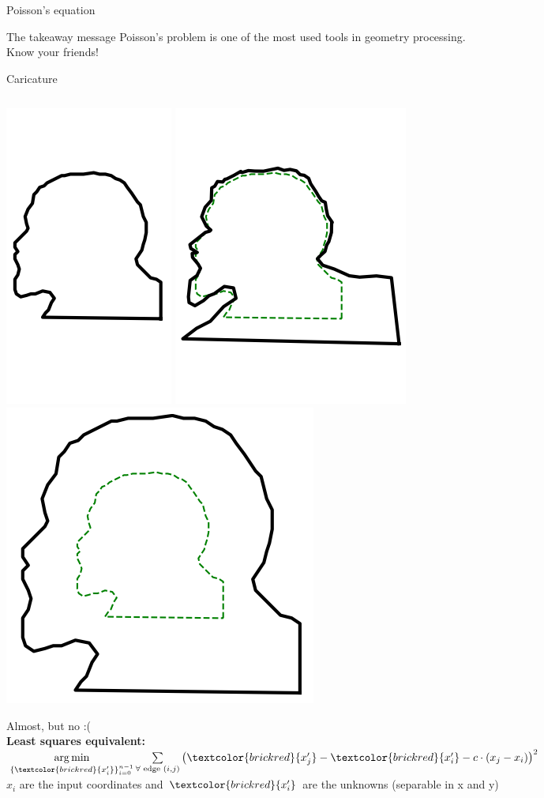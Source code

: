 \documentclass[UKenglish,aspectratio=169]{beamer}
\DeclareMathOperator*{\argmin}{arg\,min}
\newcommand\unknown[1]{\textcolor{brickred}{#1}}
\begin{document}
\begin{frame}{Poisson's equation}
\vspace{10ex}
\begin{block}{The takeaway message}
Poisson's problem is one of the most used tools in geometry processing.\\
Know your friends!
\end{block}
\end{frame}




\begin{frame}{Caricature}
\inputminted[fontsize=\footnotesize,frame=single]{python}{listings/caricature.py}
\begin{minipage}{.55\linewidth}
    \includegraphics[height=.39\linewidth]{../manuscript/img/example_6_3_a.png}
\pause
    \includegraphics[height=.39\linewidth]{../manuscript/img/example_6_3_b.png}
\pause
    \includegraphics[height=.39\linewidth]{../manuscript/img/example_6_3_d.png}
\end{minipage}
\begin{minipage}{.44\linewidth}
Almost, but no :(
\pause
~\\

\textbf{Least squares equivalent:}\\
$\argmin\limits_{\{\unknown{x'_i}\}_{i=0}^{n-1}} \sum\limits_{\forall \text{~edge~} (i,j)} \left(\unknown{x'_j} - \unknown{x'_i} -  c\cdot\left(x_j - x_i\right)  \right)^2$\\
$x_i$ are the input coordinates and $\unknown{x_i'}$ are the unknowns (separable in x and y)
\end{minipage}
\end{frame}
\end{document}
